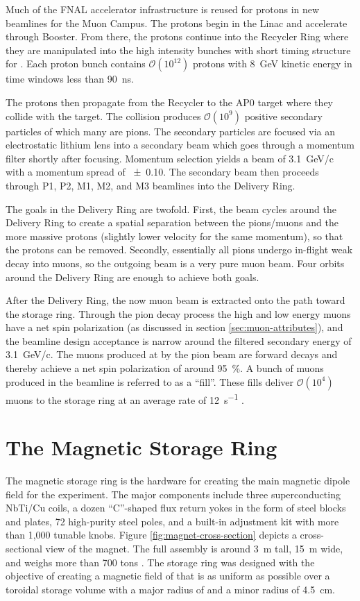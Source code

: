 Much of the FNAL accelerator infrastructure is reused for protons in new beamlines for the Muon Campus.  The protons begin in the Linac and accelerate through Booster.  From there, the protons continue into the Recycler Ring where they are manipulated into the high intensity bunches with short timing structure for \gmtwo.  Each proton bunch contains $\mathcal{O}(10^{12})$ protons with \SI{8}{\GeV} kinetic energy in time windows less than \SI{90}{\nano \second}.

The protons then propagate from the Recycler to the AP0 target where they collide with the target.  The collision produces $\mathcal{O}(10^9)$ positive secondary particles of which many are pions.  The secondary particles are focused via an electrostatic lithium lens into a secondary beam which goes through a momentum filter shortly after focusing.  Momentum selection yields a beam of \SI{3.1}{\GeV/c} with a momentum spread of \SI{\pm 0.10}{}.  The secondary beam then proceeds through P1, P2, M1, M2, and M3 beamlines into the Delivery Ring.  

The goals in the Delivery Ring are twofold.  First, the beam cycles around the Delivery Ring to create a spatial separation between the pions/muons and the more massive protons (slightly lower velocity for the same momentum), so that the protons can be removed.  Secondly, essentially all pions undergo in-flight weak decay into muons, so the outgoing beam is a very pure muon beam.  Four orbits around the Delivery Ring are enough to achieve both goals.

After the Delivery Ring, the now muon beam is extracted onto the path toward the \mugmtwo storage ring. Through the pion decay process the high and low energy muons have a net spin polarization (as discussed in section \ref{sec:muon-attributes}), and the beamline design acceptance is narrow around the filtered secondary energy of \SI{3.1}{\GeV/c}.  The muons produced at \pmagic by the pion beam are forward decays and thereby achieve a net spin polarization of around \SI{95}{\percent}.  A bunch of muons produced in the beamline is referred to as a ``fill''. These fills deliver $\mathcal{O}(10^{4})$ muons to the storage ring at an average rate of \SI{12}{\second^{-1}} \cite{e989-tdr}.

\section{The Magnetic Storage Ring} \label{sec:storage-ring}
The magnetic storage ring is the hardware for creating the main magnetic dipole field for the experiment.  The major components include three superconducting NbTi/Cu coils, a dozen ``C''-shaped flux return yokes in the form of steel blocks and plates, 72 high-purity steel poles, and a built-in adjustment kit with more than 1,000 tunable knobs.  Figure \ref{fig:magnet-cross-section} depicts a cross-sectional view of the magnet.  The full assembly is around \SI{3}{\meter} tall, \SI{15}{\meter} wide, and weighs more than 700 tons \cite{e989-tdr}.  The storage ring was designed with the objective of creating a magnetic field of \bmagic that is as uniform as possible over a toroidal storage volume with a major radius of \rmagic and a minor radius of \SI{4.5}{\cm}.

